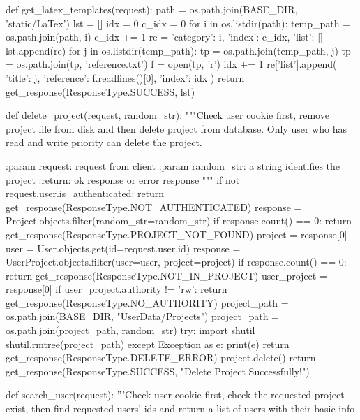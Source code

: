 def get_latex_templates(request):
    path = os.path.join(BASE_DIR, 'static/LaTex')
    lst = []
    idx = 0
    c_idx = 0
    for i in os.listdir(path):
        temp_path = os.path.join(path, i)
        c_idx += 1
        re = {
            'category': i,
            'index': c_idx,
            'list': []
        }
        lst.append(re)
        for j in os.listdir(temp_path):
            tp = os.path.join(temp_path, j)
            tp = os.path.join(tp, 'reference.txt')
            f = open(tp, 'r')
            idx += 1
            re['list'].append({
                'title': j,
                'reference': f.readlines()[0],
                'index': idx
            })
    return get_response(ResponseType.SUCCESS, lst)


def delete_project(request, random_str):
    """Check user cookie first, remove project file from disk and
    then delete project from database.
    Only user who has read and write priority can delete the project.

    :param request: request from client
    :param random_str: a string identifies the project
    :return: ok response or error response
    """
    if not request.user.is_authenticated:
        return get_response(ResponseType.NOT_AUTHENTICATED)
    response = Project.objects.filter(random_str=random_str)
    if response.count() == 0:
        return get_response(ResponseType.PROJECT_NOT_FOUND)
    project = response[0]
    user = User.objects.get(id=request.user.id)
    response = UserProject.objects.filter(user=user, project=project)
    if response.count() == 0:
        return get_response(ResponseType.NOT_IN_PROJECT)
    user_project = response[0]
    if user_project.authority != 'rw':
        return get_response(ResponseType.NO_AUTHORITY)
    project_path = os.path.join(BASE_DIR, "UserData/Projects")
    project_path = os.path.join(project_path, random_str)
    try:
        import shutil
        shutil.rmtree(project_path)
    except Exception as e:
        print(e)
        return get_response(ResponseType.DELETE_ERROR)
    project.delete()
    return get_response(ResponseType.SUCCESS, "Delete Project Successfully!")


def search_user(request):
    '''Check user cookie first, check the requested project exist,
    then find requested users' ids and return a list of users
    with their basic info

